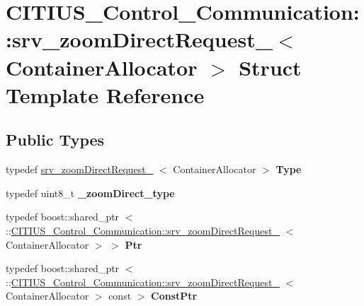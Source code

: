 \hypertarget{struct_c_i_t_i_u_s___control___communication_1_1srv__zoom_direct_request__}{\section{\-C\-I\-T\-I\-U\-S\-\_\-\-Control\-\_\-\-Communication\-:\-:srv\-\_\-zoom\-Direct\-Request\-\_\-$<$ \-Container\-Allocator $>$ \-Struct \-Template \-Reference}
\label{struct_c_i_t_i_u_s___control___communication_1_1srv__zoom_direct_request__}
}
\subsection*{\-Public \-Types}
\begin{DoxyCompactItemize}
\item 
\hypertarget{struct_c_i_t_i_u_s___control___communication_1_1srv__zoom_direct_request___a1fab5a8bc3cda11596482904fe34c226}{typedef \hyperlink{struct_c_i_t_i_u_s___control___communication_1_1srv__zoom_direct_request__}{srv\-\_\-zoom\-Direct\-Request\-\_\-}\*
$<$ \-Container\-Allocator $>$ {\bfseries \-Type}}\label{struct_c_i_t_i_u_s___control___communication_1_1srv__zoom_direct_request___a1fab5a8bc3cda11596482904fe34c226}

\item 
\hypertarget{struct_c_i_t_i_u_s___control___communication_1_1srv__zoom_direct_request___ae40e19ee30a3ac74d4efc7a3387e98dd}{typedef uint8\-\_\-t {\bfseries \-\_\-zoom\-Direct\-\_\-type}}\label{struct_c_i_t_i_u_s___control___communication_1_1srv__zoom_direct_request___ae40e19ee30a3ac74d4efc7a3387e98dd}

\item 
\hypertarget{struct_c_i_t_i_u_s___control___communication_1_1srv__zoom_direct_request___a5aed27ab882db02cbf868de73eec508a}{typedef boost\-::shared\-\_\-ptr\*
$<$ \-::\hyperlink{struct_c_i_t_i_u_s___control___communication_1_1srv__zoom_direct_request__}{\-C\-I\-T\-I\-U\-S\-\_\-\-Control\-\_\-\-Communication\-::srv\-\_\-zoom\-Direct\-Request\-\_\-}\*
$<$ \-Container\-Allocator $>$ $>$ {\bfseries \-Ptr}}\label{struct_c_i_t_i_u_s___control___communication_1_1srv__zoom_direct_request___a5aed27ab882db02cbf868de73eec508a}

\item 
\hypertarget{struct_c_i_t_i_u_s___control___communication_1_1srv__zoom_direct_request___a97ebc6171984f17db059653d59f6f18c}{typedef boost\-::shared\-\_\-ptr\*
$<$ \-::\hyperlink{struct_c_i_t_i_u_s___control___communication_1_1srv__zoom_direct_request__}{\-C\-I\-T\-I\-U\-S\-\_\-\-Control\-\_\-\-Communication\-::srv\-\_\-zoom\-Direct\-Request\-\_\-}\*
$<$ \-Container\-Allocator $>$ const  $>$ {\bfseries \-Const\-Ptr}}\label{struct_c_i_t_i_u_s___control___communication_1_1srv__zoom_direct_request___a97ebc6171984f17db059653d59f6f18c}

\end{DoxyCompactItemize}
